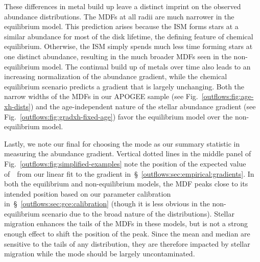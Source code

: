 These differences in metal build up leave a distinct imprint on the observed
abundance distributions.
The MDFs at all radii are much narrower in the equilibrium model.
This prediction arises because the ISM forms stars at a similar abundance for
most of the disk lifetime, the defining feature of chemical equilibrium.
Otherwise, the ISM simply spends much less time forming stars at one
distinct abundance, resulting in the much broader MDFs seen in the
non-equilibrium model.
The continual build up of metals over time also leads to an increasing
normalization of the abundance gradient, while the chemical equilibrium
scenario predicts a gradient that is largely unchanging.
Both the narrow widths of the MDFs in our APOGEE sample (see
Fig.~\ref{outflows:fig:age-xh-dists}) and the age-independent nature of the
stellar abundance gradient (see Fig.~\ref{outflows:fig:gradxh-fixed-age})
favor the equilibrium model over the non-equilibrium model.
\par
Lastly, we note our final for choosing the mode as our summary statistic in
measuring the abundance gradient.
Vertical dotted lines in the middle panel of
Fig.~\ref{outflows:fig:simplified-examples} note the position of the expected
value of~\oh~from our linear fit to the gradient
in~\S~\ref{outflows:sec:empirical:gradients}.
In both the equilibrium and non-equilibrium models, the MDF peaks close to its
intended position based on our parameter calibration
in~\S~\ref{outflows:sec:gce:calibration} (though it is less obvious in the
non-equilibrium scenario due to the broad nature of the distributions).
Stellar migration enhances the tails of the MDFs in these models, but is not
a strong enough effect to shift the position of the peak.
Since the mean and median are sensitive to the tails of any distribution, they
are therefore impacted by stellar migration while the mode should be largely
uncontaminated.


